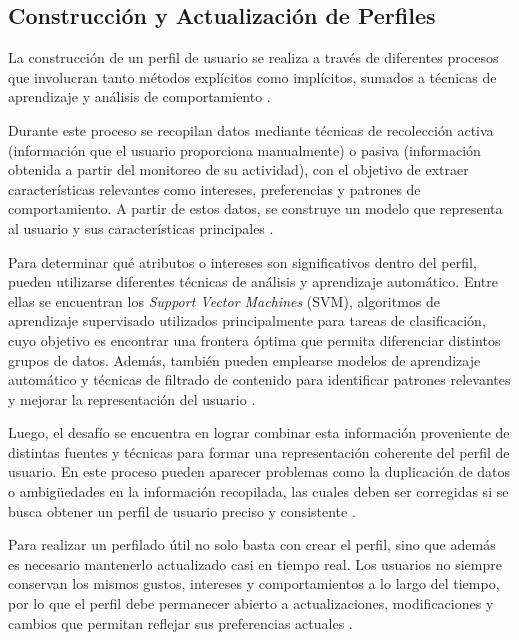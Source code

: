 \subsection{Construcción y Actualización de Perfiles}\label{subsec:construccion_perfiles}

La construcción de un perfil de usuario se realiza a través de diferentes procesos que involucran tanto métodos explícitos como implícitos, sumados a técnicas de aprendizaje y análisis de comportamiento \parencite{EkeEtAl2019}.

Durante este proceso se recopilan datos mediante técnicas de recolección activa (información que el usuario proporciona manualmente) o pasiva (información obtenida a partir del monitoreo de su actividad), con el objetivo de extraer características relevantes como intereses, preferencias y patrones de comportamiento. A partir de estos datos, se construye un modelo que representa al usuario y sus características principales \parencite{EkeEtAl2019}.

Para determinar qué atributos o intereses son significativos dentro del perfil, pueden utilizarse diferentes técnicas de análisis y aprendizaje automático. Entre ellas se encuentran los \emph{Support Vector Machines} (SVM), algoritmos de aprendizaje supervisado utilizados principalmente para tareas de clasificación, cuyo objetivo es encontrar una frontera óptima que permita diferenciar distintos grupos de datos. Además, también pueden emplearse modelos de aprendizaje automático y técnicas de filtrado de contenido para identificar patrones relevantes y mejorar la representación del usuario \parencite{KanojeEtAl2014}.

Luego, el desafío se encuentra en lograr combinar esta información proveniente de distintas fuentes y técnicas para formar una representación coherente del perfil de usuario. En este proceso pueden aparecer problemas como la duplicación de datos o ambigüedades en la información recopilada, las cuales deben ser corregidas si se busca obtener un perfil de usuario preciso y consistente \parencite{KanojeEtAl2014}.

Para realizar un perfilado útil no solo basta con crear el perfil, sino que además es necesario mantenerlo actualizado casi en tiempo real. Los usuarios no siempre conservan los mismos gustos, intereses y comportamientos a lo largo del tiempo, por lo que el perfil debe permanecer abierto a actualizaciones, modificaciones y cambios que permitan reflejar sus preferencias actuales \parencite{EkeEtAl2019}.

